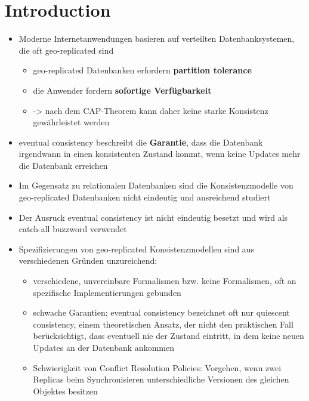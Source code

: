 \documentclass[11pt,a4paper,ngerman]{scrartcl}
\begin{document}
\section{Introduction}
\begin{itemize}
\item Moderne Internetanwendungen basieren auf verteilten Datenbanksystemen, die oft \gls{geo-replicated} sind
\begin{itemize}
\item \gls{geo-replicated} Datenbanken erfordern \textbf{partition tolerance}
\item die Anwender fordern \textbf{sofortige Verfügbarkeit}
\item -> nach dem CAP-Theorem kann daher keine starke Konsistenz gewährleistet werden
\end{itemize}
\item \gls{eventual consistency} beschreibt die \textbf{Garantie}, dass die Datenbank irgendwann in einen konsistenten Zustand kommt, wenn keine Updates mehr die Datenbank erreichen
\item Im Gegensatz zu relationalen Datenbanken sind die Konsistenzmodelle von \gls{geo-replicated} Datenbanken nicht eindeutig und ausreichend studiert
\item Der Ausruck \gls{eventual consistency} ist nicht eindeutig besetzt und wird als catch-all buzzword verwendet
\item Spezifizierungen von \gls{geo-replicated} Konsistenzmodellen sind aus verschiedenen Gründen unzureichend:
\begin{itemize}
\item verschiedene, unvereinbare Formalismen bzw. keine Formalismen, oft an spezifische Implementierungen gebunden
\item schwache Garantien; \gls{eventual consistency} bezeichnet oft nur \gls{quiescent consistency}, einem theoretischen Ansatz, der nicht den praktischen Fall berücksichtigt, dass eventuell nie der Zustand eintritt, in dem keine neuen Updates an der Datenbank ankommen
\item Schwierigkeit von Conflict Resolution Policies: Vorgehen, wenn zwei Replicas beim Synchronisieren unterschiedliche Versionen des gleichen Objektes besitzen
\end{itemize}

\end{itemize}

\pagebreak
\printglossaries
\end{document}
